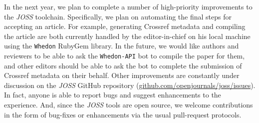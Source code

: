 \documentclass{article}
\newcommand\joss{\textit{JOSS}}
\begin{document}
In the next year, we plan to complete a number of high-priority improvements to the \joss{} toolchain.
Specifically, we plan on automating the final steps for accepting an article.
For example, generating Crossref metadata and compiling the article are both currently handled by the editor-in-chief on his local machine using the \texttt{Whedon} RubyGem library.
In the future, we would like authors and reviewers to be able to ask the \texttt{Whedon-API} bot to compile the paper for them, and other editors should be able to ask the bot to complete the submission of Crossref metadata on their behalf.
Other improvements are constantly under discussion on the \joss{} GitHub repository
(\href{https://github.com/openjournals/joss/issues}{github.com/openjournals/joss/issues}).
In fact, anyone is able to report bugs and suggest enhancements to the experience.
And, since the \joss{} tools are open source, we welcome contributions in the form of bug-fixes or enhancements via the usual pull-request protocols.
\end{document}
